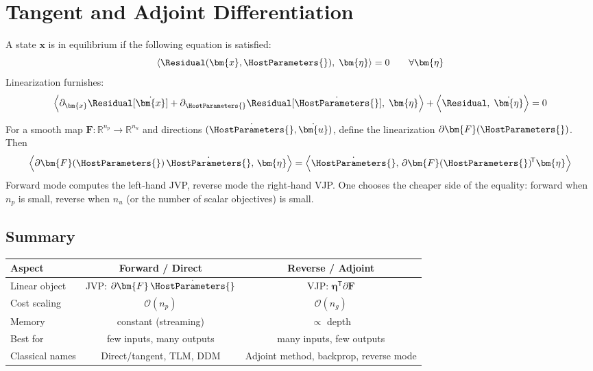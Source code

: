 

\section{Tangent and Adjoint Differentiation}

A state \(\bm{x}\) is in equilibrium if the following equation is satisfied:
\begin{equation}
    \left<\Residual (\bm{x},\HostParameters{}),\; \bm{\eta}\right> = 0
    \qquad\forall \bm{\eta}
\end{equation}
Linearization furnishes:
\begin{equation}
\left<
   \partial_{\bm{x}} \Residual [\dot{\bm{x}}] 
 + \partial_{\HostParameters{}} \Residual [\dot{\HostParameters{}}]
 ,\; \bm{\eta}
\right>
+\left<\Residual,\; \dot{\bm{\eta}}\right> = 0
\end{equation}

For a smooth map $\bm{F}:\mathbb{R}^{n_p}\!\to\!\mathbb{R}^{n_u}$ and directions
$(\dot{\HostParameters{}},\dot{\bm{u}})$, define the linearization
$\partial\bm{F}(\HostParameters{})$.  
Then
%
\[
    \left< \partial\bm{F}(\HostParameters{})\,\dot{\HostParameters{}},\,\bm{\eta} \right>
    =
    \left< \dot{\HostParameters{}},\, \partial\bm{F}(\HostParameters{})^{\!\mathsf{T}}\bm{\eta} \right>
\]
%
Forward mode computes the left‐hand JVP, reverse mode the right‐hand VJP.  
One chooses the cheaper side of the equality: forward when $n_p$ is small, reverse
when $n_u$ (or the number of scalar objectives) is small.






\subsection{Summary}

\begin{center}
\begin{tabular}{lcc}
\toprule
\textbf{Aspect} & \textbf{Forward / Direct} & \textbf{Reverse / Adjoint} \\
\midrule
Linear object & JVP: $\partial\bm{F}\,\dot{\HostParameters{}}$ &
                 VJP: $\bm{\eta}^{\mathsf{T}}\partial\bm{F}$\\
Cost scaling  & $\mathcal{O}(n_p)$ & $\mathcal{O}(n_g)$ \\
Memory        & constant (streaming) & $\propto$ depth  \\
Best for      & few inputs, many outputs &
                 many inputs, few outputs \\
Classical names &
  Direct/tangent, TLM, DDM &
  Adjoint method, backprop, reverse mode \\
\bottomrule
\end{tabular}
\end{center}


